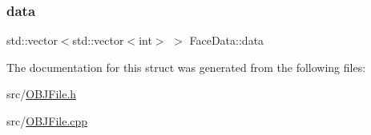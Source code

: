 \subsubsection{\texorpdfstring{data}{data}}
{\footnotesize\ttfamily std\+::vector$<$std\+::vector$<$int$>$ $>$ Face\+Data\+::data}



The documentation for this struct was generated from the following files\+:\begin{DoxyCompactItemize}
\item 
src/\mbox{\hyperlink{OBJFile_8h}{O\+B\+J\+File.\+h}}\item 
src/\mbox{\hyperlink{OBJFile_8cpp}{O\+B\+J\+File.\+cpp}}\end{DoxyCompactItemize}
